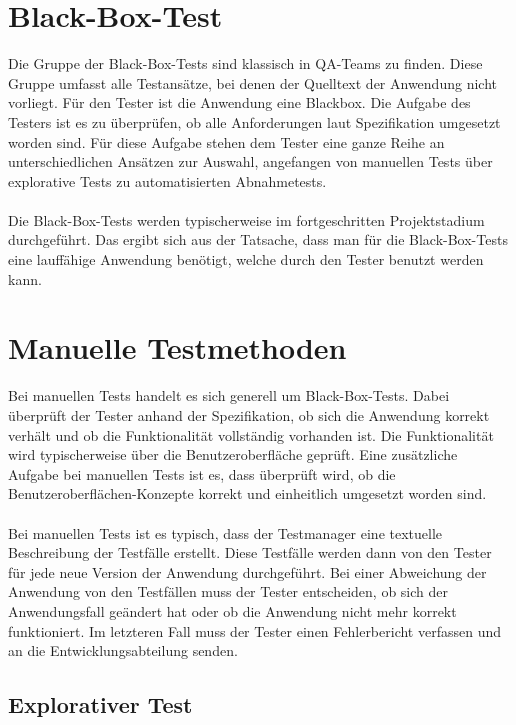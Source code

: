 \section{Black-Box-Test}

Die Gruppe der Black-Box-Tests sind klassisch in QA-Teams zu finden. Diese Gruppe umfasst alle Testansätze, bei denen der Quelltext der Anwendung nicht vorliegt. Für den Tester ist die Anwendung eine Blackbox. Die Aufgabe des Testers ist es zu überprüfen, ob alle Anforderungen laut Spezifikation umgesetzt worden sind. Für diese Aufgabe stehen dem Tester eine ganze Reihe an unterschiedlichen Ansätzen zur Auswahl, angefangen von manuellen Tests über explorative Tests zu automatisierten Abnahmetests. \\
\\
Die Black-Box-Tests werden typischerweise im fortgeschritten Projektstadium durchgeführt. Das ergibt sich aus der Tatsache, dass man für die Black-Box-Tests eine lauffähige Anwendung benötigt, welche durch den Tester benutzt werden kann.

\section{Manuelle Testmethoden}

Bei manuellen Tests handelt es sich generell um Black-Box-Tests. Dabei überprüft der Tester anhand der Spezifikation, ob sich die Anwendung korrekt verhält und ob die Funktionalität vollständig vorhanden ist. Die Funktionalität wird typischerweise über die Benutzeroberfläche geprüft. Eine zusätzliche Aufgabe bei manuellen Tests ist es, dass überprüft wird, ob die Benutzeroberflächen-Konzepte korrekt und einheitlich umgesetzt worden sind.\\
\\
Bei manuellen Tests ist es typisch, dass der Testmanager eine textuelle Beschreibung der Testfälle erstellt. Diese Testfälle werden dann von den Tester für jede neue Version der Anwendung durchgeführt. Bei einer Abweichung der Anwendung von den Testfällen muss der Tester entscheiden, ob sich der Anwendungsfall geändert hat oder ob die Anwendung nicht mehr korrekt funktioniert. Im letzteren Fall muss der Tester einen Fehlerbericht verfassen und an die Entwicklungsabteilung senden.

\subsection{Explorativer Test}

